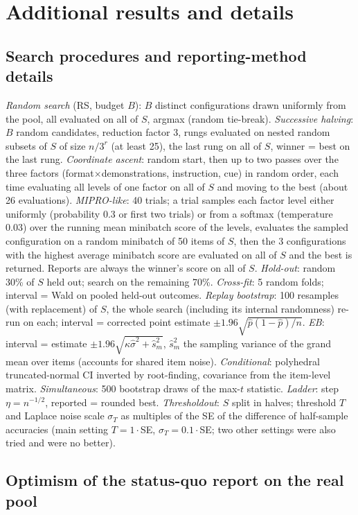 \section{Additional results and details}
\subsection{Search procedures and reporting-method details}
\emph{Random search} (RS, budget $B$): $B$ distinct configurations drawn uniformly from the pool, all evaluated on all of $S$, argmax (random tie-break). \emph{Successive halving}: $B$ random candidates, reduction factor 3, rungs evaluated on nested random subsets of $S$ of size $n/3^{r}$ (at least 25), the last rung on all of $S$, winner = best on the last rung. \emph{Coordinate ascent}: random start, then up to two passes over the three factors (format$\times$demonstrations, instruction, cue) in random order, each time evaluating all levels of one factor on all of $S$ and moving to the best (about 26 evaluations). \emph{MIPRO-like}: 40 trials; a trial samples each factor level either uniformly (probability 0.3 or first two trials) or from a softmax (temperature 0.03) over the running mean minibatch score of the levels, evaluates the sampled configuration on a random minibatch of 50 items of $S$, then the 3 configurations with the highest average minibatch score are evaluated on all of $S$ and the best is returned. Reports are always the winner's score on all of $S$.
\emph{Hold-out}: random 30\% of $S$ held out; search on the remaining 70\%. \emph{Cross-fit}: 5 random folds; interval = Wald on pooled held-out outcomes. \emph{Replay bootstrap}: 100 resamples (with replacement) of $S$, the whole search (including its internal randomness) re-run on each; interval = corrected point estimate $\pm1.96\sqrt{\hat p(1-\hat p)/n}$. \emph{EB}: interval = estimate $\pm1.96\sqrt{\kappa\hat\sigma^2+\hat s_m^2}$, $\hat s_m^2$ the sampling variance of the grand mean over items (accounts for shared item noise). \emph{Conditional}: polyhedral truncated-normal CI inverted by root-finding, covariance from the item-level matrix. \emph{Simultaneous}: 500 bootstrap draws of the max-$t$ statistic. \emph{Ladder}: step $\eta=n^{-1/2}$, reported = rounded best. \emph{Thresholdout}: $S$ split in halves; threshold $T$ and Laplace noise scale $\sigma_T$ as multiples of the SE of the difference of half-sample accuracies (main setting $T{=}1\cdot$SE, $\sigma_T{=}0.1\cdot$SE; two other settings were also tried and were no better).

\subsection{Optimism of the status-quo report on the real pool}
\begin{table}[h]
\centering\small
\caption{Reported minus true accuracy of the selected configuration (pts, $\pm1.96$ MC SE), real pool, benchmark of $n$ questions drawn i.i.d.\ from the cached population; 400 draws per cell.}
\label{tab:realopt}

\end{table}

